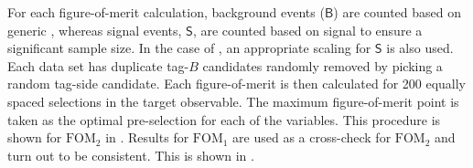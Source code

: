 For each figure-of-merit calculation, background events ($\mathsf{B}$) are counted based on generic \MC,
whereas signal events, $\mathsf{S}$, are counted based on signal \MC to ensure a significant sample size.
In the case of , an appropriate scaling for $\mathsf{S}$ is also used.
Each data set has duplicate tag-$B$ candidates randomly removed by picking a random tag-side candidate.
Each figure-of-merit is then calculated for 200 equally spaced selections in the target observable.
The maximum figure-of-merit point is taken as the optimal pre-selection for each of the variables.
This procedure is shown for $\mathrm{FOM}_2$ in .
Results for $\mathrm{FOM}_1$ are used as a cross-check for $\mathrm{FOM_2}$ and turn out to be consistent.
This is shown in .
\begin{figure}[htbp!]
    \centering
\end{figure}
